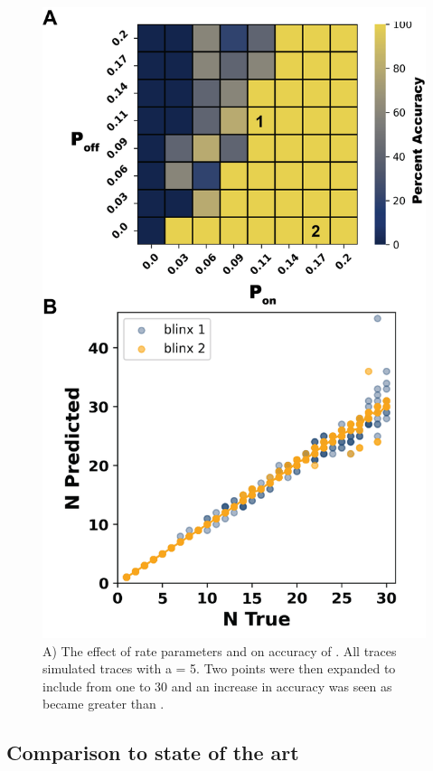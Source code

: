 \begin{figure}[ht]
  \includegraphics[width=\linewidth]{figures/kinetic_regime}
  \caption{A) The effect of rate parameters \pon and \poff on accuracy of \ours. All traces simulated traces with a \truen = 5.  Two points were then expanded to include \truen from one to 30 and an increase in accuracy was seen as \pon became greater than \poff. }
  \label{fig:results:regime}
\end{figure}

\subsection{Comparison to state of the art \lbfcs}

